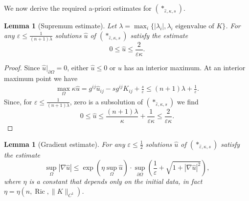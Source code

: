 \documentclass[11pt]{amsart}
\newtheorem{Lemma}[Theorem]{Lemma}
\renewcommand{\epsilon}{\varepsilon}
\DeclareMathOperator{\Ric}{Ric}    \DeclareMathOperator{\Rm}{Rm}
\def\e{\epsilon}
\def\l{\lambda}
\begin{document}
 We now derive the required a-priori estimates for $(*_{\hat{\varepsilon},\kappa,s})$.
\begin{Lemma}[Supremum estimate]\label{supest}
 Let  $\lambda=\max_i\{|\l_i|, \l_i\text{  eigenvalue of  } K\}$. For any $\e\le \frac{1}{(n+1)\lambda}$ solutions $\hat{u}$ of $(*_{\hat{\varepsilon},\kappa,s})$ satisfy the  estimate
\begin{equation*}\label{supbnd}
0\leq \hat{u}\leq \frac{2}{\varepsilon\kappa}.
\end{equation*}

\end{Lemma}
\begin{proof}
Since $\hat u|_{\partial\Omega}=0$, either $\hat{u}\leq0$ or $\hat{u}$ has an interior maximum. At an interior maximum point we have 
\begin{align*}
\max_{\Omega}\kappa \hat{u}= g^{ij}\hat{u}_{ij}-sg^{ij}K_{ij}+\frac{s}{\varepsilon}\leq (n+1)\lambda+\frac{1}{\varepsilon}.
\end{align*}
Since, for $\varepsilon\leq\frac{1}{(n+1)\lambda}$, zero is a subsolution of $(*_{\hat{\varepsilon},\kappa,s})$  we find
\begin{equation*}
0\leq \hat{u}\leq \frac{(n+1)\lambda}{\kappa}+\frac{1}{\varepsilon\kappa}\le \frac{2}{\varepsilon\kappa}.
\end{equation*}
\end{proof}
\begin{Lemma}[Gradient estimate]\label{interiorforkappa}
 For any $\e\le \frac12$ solutions $\hat{u}$ of  $(*_{\hat{\varepsilon},\kappa,s})$  satisfy the estimate
\begin{equation*}
\sup_{\Omega}|\nabla \hat{u}|\leq \exp(\eta\sup_{\Omega} \hat{u})\cdot\sup_{\partial\Omega}\left(\frac{1}{\varepsilon}+\sqrt{1+|\nabla \hat{u}|^2}\right),
\end{equation*}
where $\eta$ is a constant that depends only on the initial data, in fact $\eta=\eta(n,\Ric,\|K\|_{C^1})$.
\end{Lemma}
\end{document}
